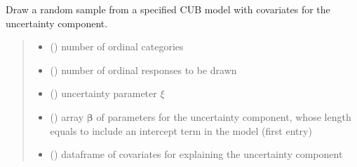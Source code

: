 \documentclass[letterpaper,10pt,english]{sphinxmanual}
\begin{document}

\begin{fulllineitems}
\label{\detokenize{cubmods:cubmods.cub_y0.draw}}
\pysigstartsignatures
{}
\pysigstopsignatures
\sphinxAtStartPar
Draw a random sample from a specified CUB model with covariates for
the uncertainty component.
\begin{quote}\begin{description}
\begin{itemize}
\item {} 
\sphinxAtStartPar
{} () \textendash{} number of ordinal categories

\item {} 
\sphinxAtStartPar
{} () \textendash{} number of ordinal responses to be drawn

\item {} 
\sphinxAtStartPar
{} () \textendash{} uncertainty parameter \(\xi\)

\item {} 
\sphinxAtStartPar
{} () \textendash{} array \(\pmb \beta\) of parameters for the uncertainty component, whose length equals 
 to include an intercept term in the model (first entry)

\item {} 
\sphinxAtStartPar
{} () \textendash{} dataframe of covariates for explaining the uncertainty component


\end{itemize}
\end{description}
\end{quote}
\end{fulllineitems}
\end{document}
